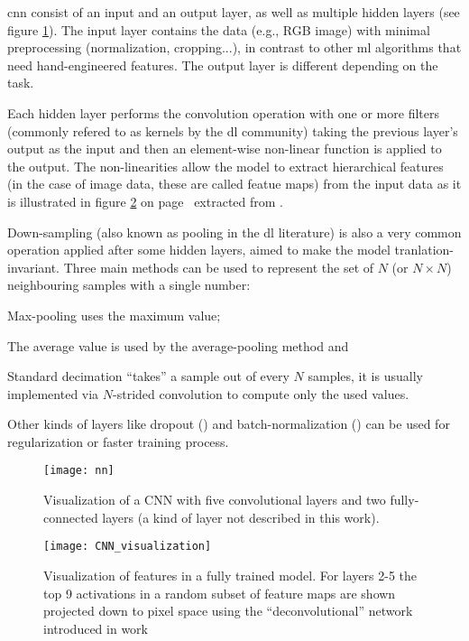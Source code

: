 \documentclass[../main.tex]{subfiles}
\begin{document}
\gls{cnn} consist of an input and an output layer, as well as multiple hidden
layers (see figure \ref{fig:alexnet}). The input layer contains the data
(e.g., RGB image) with minimal preprocessing (normalization, cropping...),
in contrast to other \gls{ml} algorithms that need hand-engineered features.
The output layer is different depending on the task.

Each hidden layer performs the convolution operation with one or more
filters (commonly refered to as kernels by the \gls{dl} community) taking the
previous layer's output as the input and then an element-wise
non-linear function is applied to the output.
The non-linearities allow the model to extract
hierarchical features (in the case of image data, these are called featue maps)
from the input data as it is illustrated in figure
\ref{fig:cnn-visualization} on page~\pageref{fig:cnn-visualization}
extracted from \cite{Zeiler2014}.

Down-sampling (also known as pooling in the \gls{dl} literature) is also a very
common operation applied after some hidden layers, aimed to make the model
tranlation-invariant. Three main methods can be used to represent the set of
$N$ (or $N \times N$) neighbouring samples with a single number:
\begin{enumerate*}[label=\itshape\alph*\upshape)]
\item Max-pooling uses the maximum value;
\item The average value is used by the average-pooling method and
\item Standard decimation ``takes'' a sample out of every $N$ samples,
it is usually implemented via $N$-strided convolution to compute only the used
values.
\end{enumerate*}

Other kinds of layers like dropout (\cite{Srivastava2014})
and batch-normalization (\cite{Ioffe2015}) can be used for regularization
or faster training process.

\begin{figure}[h]
\centering
\texttt{[image: nn]}
\caption{Visualization of a CNN with five convolutional layers and two
fully-connected layers (a kind of layer not described in this work).}
\label{fig:alexnet}
\end{figure}

\begin{figure}[h]
\centering
\texttt{[image: CNN\_visualization]}
\caption{Visualization of features in a fully trained model.
For layers 2-5 the top 9 activations in a random subset of feature maps are shown
projected down to pixel space using the ``deconvolutional'' network introduced in
\cite{Zeiler2014} work}
\label{fig:cnn-visualization}
\end{figure}
\end{document}
